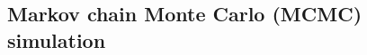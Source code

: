 \documentclass{beamer}
\begin{document}

\subsection{Markov chain Monte Carlo (MCMC) simulation}



\end{document}
